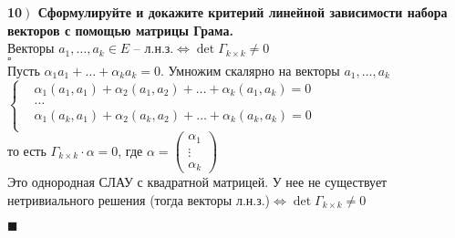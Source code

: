 \documentclass[a4paper,12pt]{article}
\begin{document}
    \textbf{10$\left.\right)$ Сформулируйте и докажите критерий линейной зависимости набора векторов с помощью матрицы Грама.}\\
    Векторы $a_1, \ldots, a_k\in E$ -- л.н.з.$\Leftrightarrow\det\Gamma_{k\times k}\ne0$\\
    $\square$\\
    Пусть $\alpha_1a_1+\ldots+\alpha_ka_k=0$. Умножим скалярно на векторы $a_1, \ldots, a_k$\\
    $\left\lbrace \begin{aligned}
                      &\alpha_1(a_1, a_1)+\alpha_2(a_1, a_2)+\ldots+\alpha_k(a_1, a_k)=0\\
                      &\ldots\\
                      &\alpha_1(a_k, a_1)+\alpha_2(a_k, a_2)+\ldots+\alpha_k(a_k, a_k)=0\\
    \end{aligned}\right.$\\
    то есть $\Gamma_{k\times k}\cdot\alpha=0$, где $\alpha=\begin{pmatrix}
                                                               \alpha_1 \\
                                                               \vdots   \\
                                                               \alpha_k
    \end{pmatrix}$\\
    Это однородная СЛАУ с квадратной матрицей. У нее не существует нетривиального решения (тогда векторы л.н.з.)$\Leftrightarrow\det\Gamma_{k\times k}\ne0$
    \begin{flushright}
        $\blacksquare$
    \end{flushright}
\end{document}
